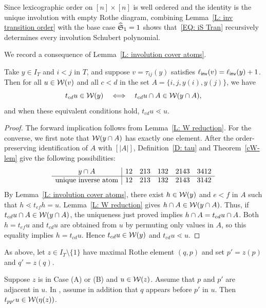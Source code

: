 \documentclass[10pt]{article}
\begin{document}
\begin{remark}\label{rec-rem}
Since lexicographic order on $[n]\times[n]$ is well ordered
and the identity is the unique involution with empty Rothe diagram,
combining Lemma~\ref{L: inv transition order} with the base case
$\widehat{\mathfrak S}_1=1$ shows that~\eqref{EQ: iS Tran}
recursively determines every involution Schubert polynomial.
\end{remark}



We record a consequence of Lemma~\ref{L: involution cover atoms}.

\begin{lemma}
\label{L: local atom identification}
Take $y\in I_T$ and $i<j$ in $T$, and suppose
$v=\tau_{ij}(y)$ satisfies $\ell_{\mathsf{inv}}(v)=\ell_{\mathsf{inv}}(y)+1$.
Then for all $u\in\mathcal{W}(v)$ and all $c<d$ in the set $A=\{i,j,y(i),y(j)\}$, we have
\[
t_{cd}u\in\mathcal{W}(y)
\quad\Longleftrightarrow\quad
t_{cd}u\cap A\in\mathcal{W}(y\cap A),
\]
and when these equivalent conditions hold,  $t_{cd}u\lessdot u$.
\end{lemma}

\begin{proof}
The forward implication follows from Lemma~\ref{L: W reduction}.
For the converse, we first note that $\mathcal{W}(y\cap A)$ has exactly one element.
After the order-preserving identification of $A$ with $[|A|]$,
Definition~\ref{D: tau} and Theorem~\ref{cW-lem} give the following possibilities:
\[
\begin{array}{c|ccccc}
y\cap A & 12 & 213 & 132 & 2143 & 3412 \\
\hline
\text{unique inverse atom} & 12 & 213 & 132 & 2143 & 3142
\end{array}
\]
By Lemma~\ref{L: involution cover atoms}, there exist $h\in\mathcal{W}(y)$
and $e<f$ in $A$ such that $h\lessdot t_{ef}h=u$.
Lemma~\ref{L: W reduction} gives $h\cap A\in\mathcal{W}(y\cap A)$.
Thus, if $t_{cd}u\cap A\in\mathcal{W}(y\cap A)$, the uniqueness just proved
implies $h\cap A=t_{cd}u\cap A$.
Both $h=t_{ef}u$ and $t_{cd}u$ are obtained from $u$ by permuting only
values in $A$, so this equality implies $h=t_{cd}u$.
Hence $t_{cd}u\in\mathcal{W}(y)$ and $t_{cd}u\lessdot u$.
\end{proof}

As above, 
let $ z\in I_T\setminus\{1\}$
have maximal Rothe element $(q,p)$
and set $p'=z(p)$ and $q'=z(q)$.
\begin{lemma}
\label{L: AB eta(w)}
Suppose   $z$ is in Case (A) or (B) and $u\in\mathcal{W}(z)$.
Assume that $p$ and $p'$ are adjacent in $u$.
In \CaseB, assume in addition that $q$ appears before $p'$ in $u$.
Then $t_{pp'}u\in\mathcal{W}(\eta(z))$.
\end{lemma}
\end{document}
